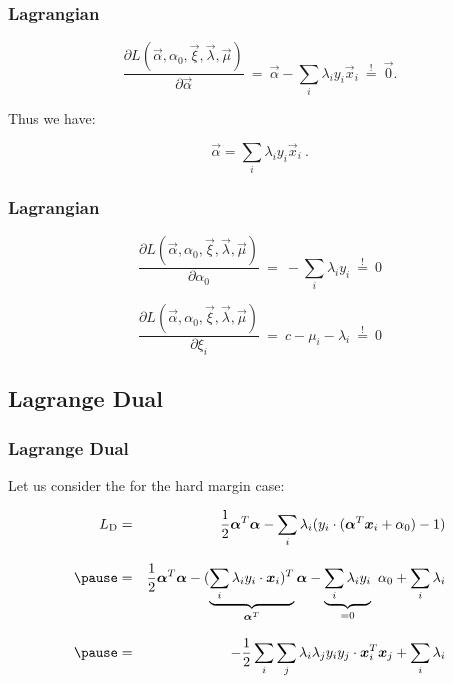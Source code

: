 \begin{frame}
  \frametitle{Lagrangian \cont}

 
  \begin{displaymath}
    \frac{\partial  L(\vec \alpha, \alpha_0, \vec \xi, \vec \lambda, \vec \mu)}{\partial \vec \alpha} ~=~ 
    \vec \alpha - \sum_i \lambda_i y_i \vec x_i ~\stackrel{!}{=}~ 
    \vec 0.
  \end{displaymath}

  Thus we have:

  \begin{displaymath}
    \vec \alpha = \sum_i \lambda_i y_i \vec x_i~. 
  \end{displaymath}
\end{frame}
 
 
\begin{frame}

  \frametitle{Lagrangian \cont}
  
  
  \begin{displaymath}
    \frac{\partial  L(\vec \alpha, \alpha_0, \vec \xi, \vec \lambda, \vec \mu)}{\partial \alpha_0} ~=~
   -\sum_i \lambda_i y_i ~\stackrel{!}{=}~ 
   0
  \end{displaymath}
  \pspread

  
  \begin{displaymath}
    \frac{\partial  L(\vec \alpha, \alpha_0, \vec \xi, \vec \lambda, \vec \mu)}{\partial \xi_i} ~=~ 
    c - \mu_i - \lambda_i ~\stackrel{!}{=}~ 
    0
  \end{displaymath}
\end{frame}


\subsection{Lagrange Dual}

\begin{frame}
  \frametitle{Lagrange Dual}
 
  Let us consider the  for the hard margin case:
  
  \begin{eqnarray*}
    L_\text{D}
    &=& \frac{1}{2} {\vec \alpha^T \vec \alpha} -
        \sum_i \lambda_i (y_i\cdot (\vec \alpha^T\vec x_i + \alpha_0) -1) \\[.3cm] \pause
    &=& \frac{1}{2}{\vec \alpha^T \vec \alpha} - 
        (\underbrace{\sum_i \lambda_i y_i\cdot \vec x_i)^T}_{{\vec \alpha^T}} \vec \alpha - 
        \underbrace{ \sum_i \lambda_iy_i}_{ = 0}\ \alpha_0 + 
        \sum_i \lambda_i \\[.3cm] \pause
    &=& -\frac{1}{2} \sum_i \sum_j \lambda_i \lambda_j y_i y_j \cdot \vec x_i^T\vec x_j +  \sum_i \lambda_i
  \end{eqnarray*}
\end{frame}


